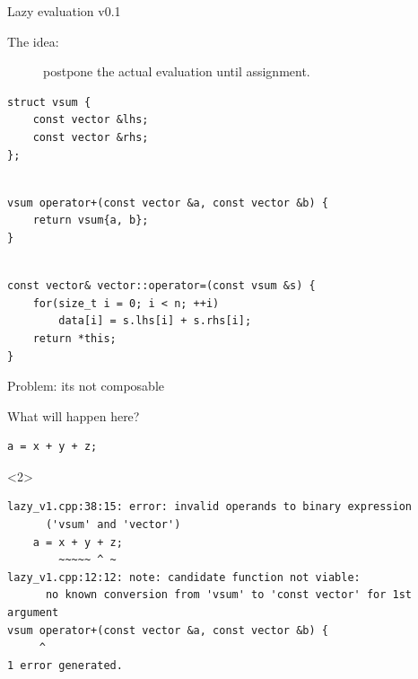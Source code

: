 \documentclass[@BEAMER_OPTIONS@]{beamer}
\begin{document}

\begin{frame}[fragile]{Lazy evaluation v0.1}
    \begin{description}
        \item[The idea:] postpone the actual evaluation until assignment.
    \end{description}
    \pause
    \begin{exampleblock}{}
        \begin{lstlisting}
struct vsum {
    const vector &lhs;
    const vector &rhs;
};
        \end{lstlisting}
        \pause
        \begin{lstlisting}[firstnumber=last]

vsum operator+(const vector &a, const vector &b) {
    return vsum{a, b};
}
        \end{lstlisting}
        \pause
        \begin{lstlisting}[firstnumber=last]

const vector& vector::operator=(const vsum &s) {
    for(size_t i = 0; i < n; ++i)
        data[i] = s.lhs[i] + s.rhs[i];
    return *this;
}
        \end{lstlisting}
    \end{exampleblock}
\end{frame}

\note{ }

\begin{frame}[fragile]{Problem: its not composable}
    \begin{exampleblock}{What will happen here?}
        \begin{lstlisting}
a = x + y + z;
        \end{lstlisting}
    \end{exampleblock}

    \begin{exampleblock}<2>{}
        \begin{verbatim}
lazy_v1.cpp:38:15: error: invalid operands to binary expression
      ('vsum' and 'vector')
    a = x + y + z;
        ~~~~~ ^ ~
lazy_v1.cpp:12:12: note: candidate function not viable:
      no known conversion from 'vsum' to 'const vector' for 1st argument
vsum operator+(const vector &a, const vector &b) {
     ^
1 error generated.
        \end{verbatim}
    \end{exampleblock}
\end{frame}
\end{document}
